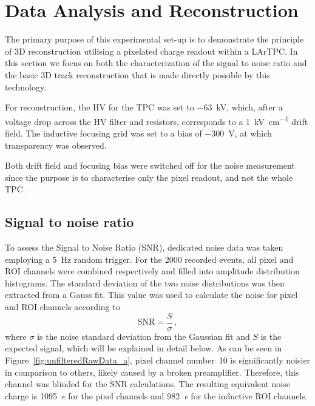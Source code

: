 \documentclass[instruments,article,submit,moreauthors,pdftex]{Definitions/mdpi}
\newcommand*{\m}{\mathrm}
\begin{document}
\section{Data Analysis and Reconstruction} \label{sec:results}

The primary purpose of this experimental set-up is to demonstrate the principle of 3D reconstruction utilising a pixelated charge readout within a LArTPC. 
In this section we focus on both the characterization of the signal to noise ratio and the basic 3D track reconstruction that is made directly possible by this technology.

For reconstruction, the HV for the TPC was set to \SI{-63}{\kilo\volt}, which, after a voltage drop across the HV filter and resistors, corresponds to a \SI{1}{\kilo\volt\per\centi\meter} drift field. The inductive focusing grid was set to a bias of \SI{-300}{\volt}, at which transparency was observed. 

Both drift field and focusing bias were switched off for the noise measurement since the purpose is to characterise only the pixel readout, and not the whole TPC.


\subsection{Signal to noise ratio}

To assess the Signal to Noise Ratio (SNR), dedicated noise data was taken employing a \SI{5}{\hertz} random trigger.
For the \num{2000} recorded events, all pixel and ROI channels were combined respectively and filled into amplitude distribution histograms.
The standard deviation of the two noise distributions was then extracted from a Gauss fit.
This value was used to calculate the noise for pixel and ROI channels according to
\begin{equation}
\m{SNR} = \frac{S}{\sigma}\,\m{,}
\label{eq:snr}
\end{equation}
where $\sigma$ is the noise standard deviation from the Gaussian fit and $S$ is the expected signal, which will be explained in detail below.
As can be seen in Figure~\ref{fig:unfilteredRawData_a}, pixel channel number~\num{10} is significantly noisier in comparison to others, likely caused by a broken preamplifier.
Therefore, this channel was blinded for the SNR calculations.
The resulting equivalent noise charge is \SI{1095}{\elementarycharge} for the pixel channels and \SI{982}{\elementarycharge} for the inductive ROI channels.
\end{document}
